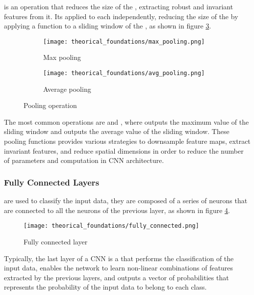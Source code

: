        is an operation that reduces the size of the ,
      extracting robust and invariant features from it\cite{goodfellow2016deep, intelligence2021modern}.
      Its applied to each  independently, reducing the size of the
       by applying a function to a sliding window
      of the , as shown in figure \ref{fig:pooling_operation}.
      \begin{figure}[htbp]
        \centering
        \begin{subfigure}[b]{0.45\linewidth}
          \centering
          \texttt{[image: theorical\_foundations/max\_pooling.png]}
          \caption{Max pooling}
          \label{fig:max_pooling}
        \end{subfigure}
        \begin{subfigure}[b]{0.45\linewidth}
          \centering
          \texttt{[image: theorical\_foundations/avg\_pooling.png]}
          \caption{Average pooling}
          \label{fig:avg_pooling}
        \end{subfigure}
        \caption{Pooling operation}
        \label{fig:pooling_operation}
      \end{figure}

      The most common  operations are  and ,
      where  outputs the maximum value of the sliding window and
       outputs the average value of the sliding window\cite{goodfellow2016deep, intelligence2021modern}.
      These pooling functions provides various strategies to downsample feature maps,
      extract invariant features, and reduce spatial dimensions in order to reduce
      the number of parameters and computation in CNN architecture.

    \subsubsection{Fully Connected Layers}

       are used to classify the input data, they are
      composed of a series of neurons that are connected to all the neurons of
      the previous layer, as shown in figure \ref{fig:fully_connected_layer}.
      \begin{figure}[htbp]
        \centering
        \texttt{[image: theorical\_foundations/fully\_connected.png]}
        \caption{Fully connected layer}
        \label{fig:fully_connected_layer}
      \end{figure}
      Typically, the last layer of a CNN is a  that
      performs the classification of the input data, enables the network to
      learn non-linear combinations of features extracted by the previous layers,
      and outputs a vector of probabilities that represents the probability of
      the input data to belong to each class\cite{goodfellow2016deep, intelligence2021modern}.

